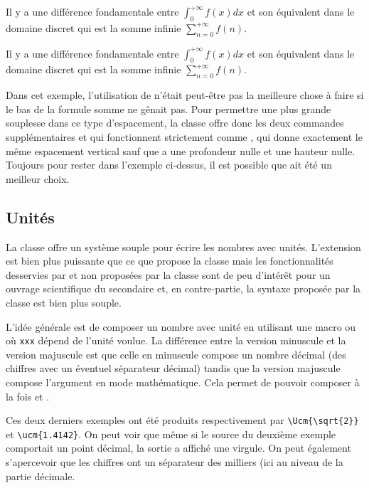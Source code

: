 \documentclass[nocrop]{sesamanuel}
\begin{document}
\begin{minipage}{0.7\linewidth}
  Il y a une différence fondamentale entre $\displaystyle\int_0^{+\infty} f(x)dx$
  et son équivalent dans le domaine discret qui est la somme infinie
  $\displaystyle\sum_{n=0}^{+\infty} f(n)$.

  Il y a une différence fondamentale entre $\displaystyle\int_0^{+\infty} f(x)dx$
  et son équivalent dans le domaine discret qui est la somme infinie
  \Strut[2]$\displaystyle\sum_{n=0}^{+\infty} f(n)$.
\end{minipage}

Dans cet exemple, l'utilisation de  n'était peut-être pas
la meilleure chose à faire si le bas de la formule somme ne gênait
pas. Pour permettre une plus grande souplesse dans ce type
d'espacement, la classe offre donc les deux commandes supplémentaires
 et  qui fonctionnent strictement comme
, qui donne exactement le même espacement vertical sauf que
 a une profondeur nulle et  une hauteur
nulle. Toujours pour rester dans l'exemple ci-dessus, il est possible
que  ait été un meilleur choix.

\subsection{Unités}
La classe offre un système souple pour écrire les nombres avec
unités. L'extension  est bien plus puissante que ce
que propose la classe mais les fonctionnalités desservies par
 et non proposées par la classe sont de peu d'intérêt
pour un ouvrage scientifique du secondaire et, en contre-partie, la
syntaxe proposée par la classe est bien plus souple.

L'idée générale est de composer un nombre avec unité en utilisant une
macro  ou  où \texttt{xxx} dépend de l'unité
voulue. La différence entre la version minuscule et la version
majuscule est que celle en minuscule compose un nombre décimal (des
chiffres avec un éventuel séparateur décimal) tandis que la version
majuscule compose l'argument en mode mathématique. Cela permet de
pouvoir composer à la fois  et .

Ces deux derniers exemples ont été produits respectivement par
\verb+\Ucm{\sqrt{2}}+ et \verb+\ucm{1.4142}+. On peut voir que même si
le source du deuxième exemple comportait un point décimal, la sortie a
affiché une virgule. On peut également s'apercevoir que les chiffres
ont un séparateur des milliers (ici au niveau de la partie décimale.
\end{document}
